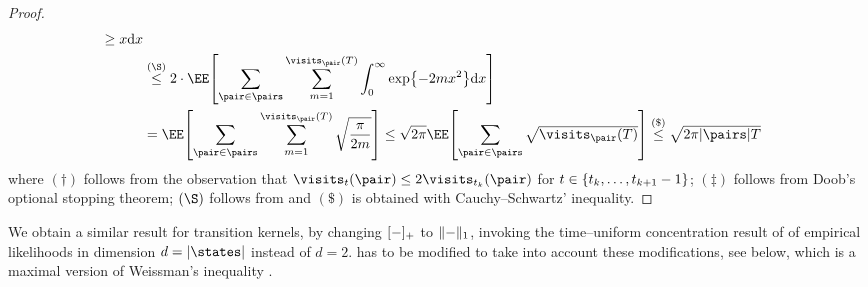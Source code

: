 \documentclass[preprint,cleveref,12pt]{colt2025}
\DeclarePairedDelimiter{\braces}{\{}{\}}	%
\DeclarePairedDelimiter{\brackets}{[}{]}	%
\DeclarePairedDelimiter{\abs}{\lvert}{\rvert}	%
\DeclarePairedDelimiter{\pospart}{[}{]_{+}}	%
\DeclarePairedDelimiter{\norm}{\lVert}{\rVert}	%
\newcommand{\tsqrt}[1]{{\textstyle\sqrt{#1}}} %
\def\integral{\int}
\begin{document}
\begin{proof}
\begin{align*}
{{{                    }
                    \ge
                    x
                } \mathrm{d} x
            }
            \\
            & \overset{(\S)}\le
            2 \cdot \EE \brackets*{
                \sum_{\pair \in \pairs}
                \sum_{m=1}^{\visits_\pair(T)}
                \integral_0^\infty
                \exp \braces*{
                    -2m x^2
                }
                \mathrm{d} x
            }
            \\
            & =
            \EE \brackets*{
                \sum_{\pair \in \pairs}
                \sum_{m=1}^{\visits_\pair(T)}
                \sqrt{\frac{\pi}{2m}}
            }
            \le 
            \sqrt{2 \pi}
            \EE \brackets*{
                \sum_{\pair \in \pairs}
                \tsqrt{\visits_\pair (T)}
            }
            \overset{(\$)}\le
            \tsqrt{2 \pi \abs{\pairs} T}
        \end{align*}
        where
        $(\dagger)$ follows from the observation that $\visits_{t}(\pair) \le 2 \visits_{t_k}(\pair)$ for $t \in \braces{t_k, \ldots, t_{k+1}-1}$;
        $(\ddagger)$ follows from Doob's optional stopping theorem;
        $(\S)$ follows from  and 
        $(\$)$ is obtained with Cauchy--Schwartz' inequality. 
    \end{proof}

    We obtain a similar result for transition kernels, by changing $\pospart{-}$ to $\norm{-}_1$, invoking the time--uniform concentration result of \cite[Proposition~1]{jonsson2020planning} of empirical likelihoods in dimension $d = \abs{\states}$ instead of $d = 2$.  has to be modified to take into account these modifications, see  below, which is a maximal version of Weissman's inequality \cite{weissman_inequalities_2003}. 
\end{document}

